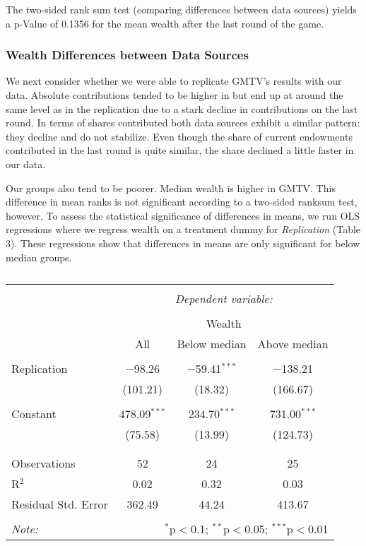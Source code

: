 \documentclass[11pt,]{article}
\begin{document}
The two-sided rank sum test (comparing differences between data sources)
yields a p-Value of 0.1356 for the mean wealth after the last round of
the game.

\hypertarget{wealth-differences-between-data-sources}{%
\subsubsection{Wealth Differences between Data
Sources}\label{wealth-differences-between-data-sources}}

We next consider whether we were able to replicate GMTV's results with
our data. Absolute contributions tended to be higher in \citet{GMTV2017}
but end up at around the same level as in the replication due to a stark
decline in contributions on the last round. In terms of shares
contributed both data sources exhibit a similar pattern: they decline
and do not stabilize. Even though the share of current endowments
contributed in the last round is quite similar, the share declined a
little faster in our data.

Our groups also tend to be poorer. Median wealth is higher in GMTV. This
difference in mean ranks is not significant according to a two-sided
ranksum test, however. To assess the statistical significance of
differences in means, we run OLS regressions where we regress wealth on
a treatment dummy for \emph{Replication} (Table 3). These regressions
show that differences in means are only significant for below median
groups.

\begin{table}[!htbp] \centering 
  \caption{} 
  \label{} 
\begin{tabular}{@{\extracolsep{5pt}}lccc} 
\\[-1.8ex]\hline 
\hline \\[-1.8ex] 
 & \multicolumn{3}{c}{\textit{Dependent variable:}} \\ 
\cline{2-4} 
\\[-1.8ex] & \multicolumn{3}{c}{Wealth} \\ 
 & All & Below median & Above median \\ 
\hline \\[-1.8ex] 
 Replication & $-$98.26 & $-$59.41$^{***}$ & $-$138.21 \\ 
  & (101.21) & (18.32) & (166.67) \\ 
  & & & \\ 
 Constant & 478.09$^{***}$ & 234.70$^{***}$ & 731.00$^{***}$ \\ 
  & (75.58) & (13.99) & (124.73) \\ 
  & & & \\ 
\hline \\[-1.8ex] 
Observations & 52 & 24 & 25 \\ 
R$^{2}$ & 0.02 & 0.32 & 0.03 \\ 
Residual Std. Error & 362.49 & 44.24 & 413.67 \\ 
\hline 
\hline \\[-1.8ex] 
\textit{Note:}  & \multicolumn{3}{r}{$^{*}$p$<$0.1; $^{**}$p$<$0.05; $^{***}$p$<$0.01} \\ 
\end{tabular} 
\end{table}
\end{document}
